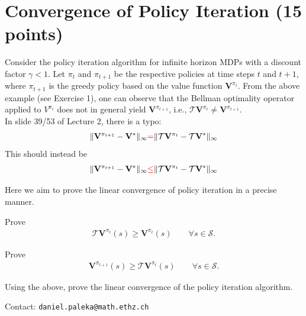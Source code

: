 \newpage
\section{Convergence of Policy Iteration (15 points)}
Consider the policy iteration algorithm for infinite horizon MDPs with a discount factor $\gamma < 1$. Let $\pi_t$ and $\pi_{t+1}$ be the respective policies at time steps $t$ and $t+1$, where $\pi_{t+1}$ is the greedy policy based on the value function $\mathbf{V}^{\pi_t}$.   
From the above example (see Exercise 1), one can observe that the Bellman optimality operator applied to $V^{\pi_t}$ does not in general yield $\mathbf{V}^{\pi_{t+1}}$, i.e., $\mathcal{T}\mathbf{V}^{\pi_t} \neq \mathbf{V}^{\pi_{t+1}}$. \\


In slide 39/53 of Lecture 2, there is a typo:
    \begin{align}
    \| \mathbf{V}^{\pi_{t+1}} - \mathbf{V}^*\|_\infty {\color{red}=} \|\mathcal{T}\mathbf{V}^{\pi_{t}} - \mathcal{T}\mathbf{V}^*\|_\infty 
    \end{align}
This should instead be 
    \begin{align}
    \| \mathbf{V}^{\pi_{t+1}} - \mathbf{V}^*\|_\infty {\color{red}\leq} \|\mathcal{T}\mathbf{V}^{\pi_{t}} - \mathcal{T}\mathbf{V}^*\|_\infty 
    \end{align}
    
Here we aim to prove the linear convergence of policy iteration in a precise manner. 
\begin{questions}
    \question[5] Prove 
    \begin{align*}
	    \mathcal{T} \mathbf{V}^{\pi_{t}}(s) \geq \mathbf{V}^{\pi_t}(s) \quad \quad \forall s \in \mathcal{S}.
    \end{align*} 
 
	\question[5] Prove
     \begin{align*}
	     \mathbf{V}^{\pi_{t+1}}(s) \geq \mathcal{T} \mathbf{V}^{\pi_{t}}(s) \quad \quad \forall s \in \mathcal{S}.
    \end{align*}
    
    \question[5] Using the above, prove the linear convergence of the policy iteration algorithm.
\end{questions}

Contact: \texttt{daniel.paleka@math.ethz.ch}


